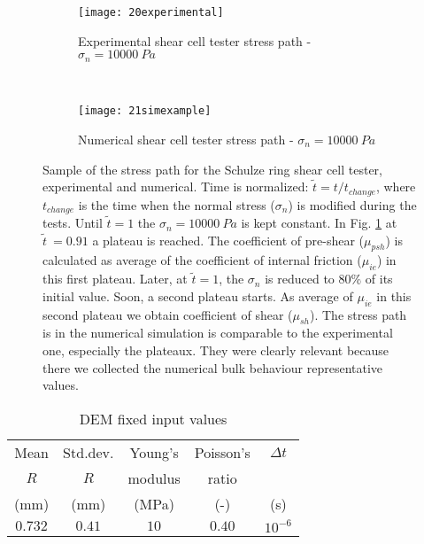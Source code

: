 \documentclass[review]{elsarticle}
\begin{document}
\begin{figure}[htp] \centering
    \begin{subfigure}[b]{0.96\columnwidth}
        \texttt{[image: 20experimental]}
        \caption{Experimental shear cell tester stress path - $\sigma_n = 10000
        ~Pa$}
        \label{fig:20experimental} 
    \end{subfigure}\\
        \begin{subfigure}[b]{0.96\columnwidth}
        \texttt{[image: 21simexample]}
        \caption{Numerical shear cell tester stress path - $\sigma_n = 10000
        ~Pa$}
        \label{fig:21simexample} 
    \end{subfigure}
    \caption[Stress path]{Sample of the stress path for
	the Schulze ring shear cell tester, experimental and numerical.
	Time is normalized: $\tilde{t} = t/t_{change}$, where $t_{change}$ is the
	time when the normal stress ($\sigma_n$) is modified during the tests.
	Until $\tilde{t}=1$ the $\sigma_n = 10000 ~Pa$ is kept constant. 
	In Fig. \ref{fig:20experimental} at $\tilde{t}~=0.91$
 	a plateau is reached.
	The coefficient of pre-shear ($\mu_{psh}$) is calculated as average of the
	coefficient of internal friction ($\mu_{ie}$) in this first plateau.
	Later, at $\tilde{t}=1$, the $\sigma_n$ is reduced to $80 \%$ of its initial
	value.
	Soon, a second plateau starts.
	As average of $\mu_{ie}$ in this second plateau we obtain coefficient of
	shear ($ \mu_{sh}$).
	The stress path is in the numerical simulation is comparable to the
	experimental one, especially the plateaux.
	They were clearly relevant because there we collected the numerical bulk
	behaviour representative values. }
    \label{fig:40experimentalsimulation}
\end{figure}
\begin{table}[h]
\centering
\begin{tabular}{ccccc}
\hline
    Mean & Std.dev.  & Young's & Poisson's & $\Delta t$\\
    $R$ & $R$ & modulus & ratio & \\
    (mm)  & (mm)  & (MPa) & (-) & (s)\\
    \hline
    $0.732$ & $0.41$ & $10$    & $0.40$ & $10^{-6}$\\
\hline
\end{tabular}
\caption{DEM fixed input values}
\label{tab:09DEMFixedinputvalues}
\end{table}
\end{document}
